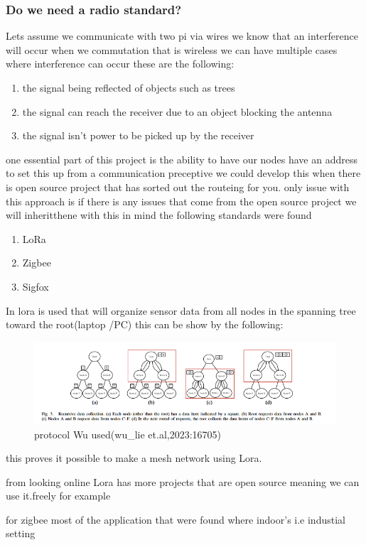 \subsubsection{Do we need a radio standard?}
Lets assume we communicate with two pi via wires  we know that an interference will occur when  we  commutation that is wireless
we can have multiple cases where interference can  occur these are  the following:
\begin{enumerate}
    \item the signal being reflected of objects such as  trees
    \item the signal can reach the  receiver due to an object blocking the antenna
    \item the signal isn't  power to be picked up by the receiver
\end{enumerate}
one essential part of this project is the  ability to have  our nodes have an address to set this up
from a communication preceptive we could develop this when there is open source project that has sorted out the routeing for  you.
only issue with this approach is if there is any issues that come from the open source project we will inheritthene
with this in mind the following standards were found
\begin{enumerate}
    \item LoRa
    \item Zigbee
    \item Sigfox
\end{enumerate}
In \cite{Wu_Liebeherr_2023} lora is used that will organize sensor
data from all nodes in the spanning tree toward the root(laptop /PC) this can be show by the  following:
\begin{figure}[h!]
    \centering
    \includegraphics[width=0.5\linewidth]{Images/lora_example_routing_proto.png}
    \caption{protocol Wu used(wu\_lie et.al,2023:16705)}
    \label{protocol Wu used(wu_lie et.al,2023:16705)}
\end{figure}  
this proves it possible  to make a  mesh network using Lora.
\par 
from looking online Lora has more projects that are open source meaning we can use it.freely for example 
\par
for zigbee most of the application  that were found where indoor's i.e industial setting
  
